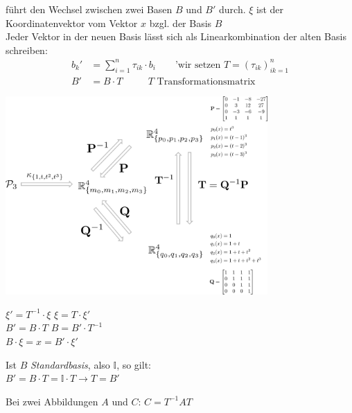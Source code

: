 \documentclass[a4paper,twocolumn]{article}
\begin{document}
		\begin{fdef}[Transformationsmatrix]
			führt den Wechsel zwischen zwei Basen $B$ und $B'$ durch. $\xi$ ist der Koordinatenvektor vom Vektor $x$
			bzgl. der Basis $B$\\
	
			Jeder Vektor in der neuen Basis lässt sich als Linearkombination der alten Basis schreiben:
			\begin{align*}
				b_k' &= \sum_{i=1}^n \tau_{ik} \cdot b_i \qquad \text{'wir setzen }T = (\tau_{ik})^n_{ik=1} \\
				B' &= B \cdot T \qquad \text{ $T$ Transformationsmatrix }
			\end{align*}
			
		\end{fdef}
		\hspace{-5mm}
		\includegraphics[width=10cm]{basistransformation_hoch.png}
		\begin{fregeln}[Formeln]
			$\xi ' = T^{-1} \cdot \xi$ \hspace{2mm} $\xi = T \cdot \xi '$\\
			$B' = B \cdot T$ \hspace{2mm} $B = B' \cdot T^{-1}$\\
			$B \cdot \xi = x = B' \cdot \xi '$
		\end{fregeln}
		
		\begin{fmerke}[$B$ = \textit{Standardbasis} $\mathbb{I}$]
			Ist $B$ \textit{Standardbasis}, also $\mathbb{I}$, so gilt:\\
			$B' = B \cdot T = \mathbb{I} \cdot T \rightarrow T = B'$\\[-4mm]
		\end{fmerke}
		
		\begin{fmerke}
			Bei zwei Abbildungen $A$ und $C$:
			$C = T^{-1}AT$
		\end{fmerke}
\end{document}
